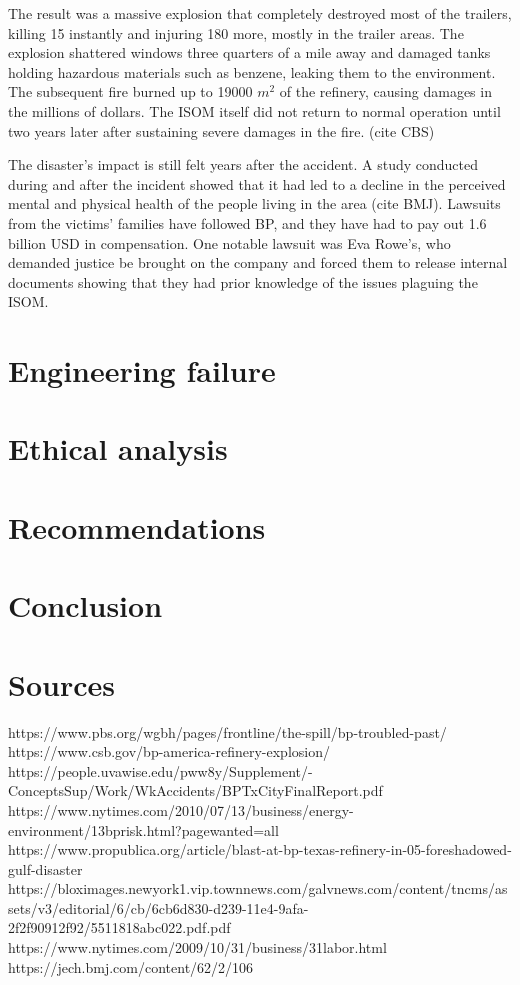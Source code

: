 \documentclass[12pt]{article}
\begin{document}
	The result was a massive explosion that completely destroyed most of the trailers, killing 15 instantly and injuring 180 more, mostly in the trailer areas. The explosion shattered windows three quarters of a mile away and damaged tanks holding hazardous materials such as benzene, leaking them to the environment. The subsequent fire burned up to 19000 $m^2$ of the refinery, causing damages in the millions of dollars. The ISOM itself did not return to normal operation until two years later after sustaining severe damages in the fire. (cite CBS)
	
	The disaster's impact is still felt years after the accident. A study conducted during and after the incident showed that it had led to a decline in the perceived mental and physical health of the people living in the area (cite BMJ). Lawsuits from the victims' families have followed BP, and they have had to pay out 1.6 billion USD in compensation. One notable lawsuit was Eva Rowe's, who demanded justice be brought on the company and forced them to release internal documents showing that they had prior knowledge of the issues plaguing the ISOM. 

	\section*{Engineering failure}
	\section*{Ethical analysis}
	\section*{Recommendations}
	\section*{Conclusion}
	\section*{Sources}
	https://www.pbs.org/wgbh/pages/frontline/the-spill/bp-troubled-past/
	https://www.csb.gov/bp-america-refinery-explosion/
	https://people.uvawise.edu/pww8y/Supplement/-ConceptsSup/Work/WkAccidents/BPTxCityFinalReport.pdf
	https://www.nytimes.com/2010/07/13/business/energy-environment/13bprisk.html?pagewanted=all
	https://www.propublica.org/article/blast-at-bp-texas-refinery-in-05-foreshadowed-gulf-disaster
	https://bloximages.newyork1.vip.townnews.com/galvnews.com/content/tncms/assets/v3/editorial/6/cb/6cb6d830-d239-11e4-9afa-2f2f90912f92/5511818abc022.pdf.pdf
	https://www.nytimes.com/2009/10/31/business/31labor.html
	https://jech.bmj.com/content/62/2/106
\end{document}
